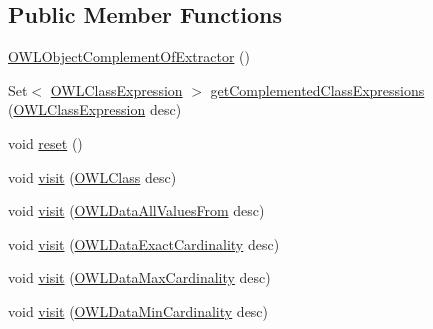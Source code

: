 \subsection*{Public Member Functions}
\begin{DoxyCompactItemize}
\item 
\hyperlink{classorg_1_1semanticweb_1_1owlapi_1_1normalform_1_1_o_w_l_object_complement_of_extractor_ad3b2af82adb14c53749efbf0d4d78eea}{O\-W\-L\-Object\-Complement\-Of\-Extractor} ()
\item 
Set$<$ \hyperlink{interfaceorg_1_1semanticweb_1_1owlapi_1_1model_1_1_o_w_l_class_expression}{O\-W\-L\-Class\-Expression} $>$ \hyperlink{classorg_1_1semanticweb_1_1owlapi_1_1normalform_1_1_o_w_l_object_complement_of_extractor_a95a6959c38d18a62e2d6a3ead9c0b31d}{get\-Complemented\-Class\-Expressions} (\hyperlink{interfaceorg_1_1semanticweb_1_1owlapi_1_1model_1_1_o_w_l_class_expression}{O\-W\-L\-Class\-Expression} desc)
\item 
void \hyperlink{classorg_1_1semanticweb_1_1owlapi_1_1normalform_1_1_o_w_l_object_complement_of_extractor_aabba61425b4eb8cdaef51fb9c92c42fb}{reset} ()
\item 
void \hyperlink{classorg_1_1semanticweb_1_1owlapi_1_1normalform_1_1_o_w_l_object_complement_of_extractor_a6d03acc1e968e08c922ce819e4b933fe}{visit} (\hyperlink{interfaceorg_1_1semanticweb_1_1owlapi_1_1model_1_1_o_w_l_class}{O\-W\-L\-Class} desc)
\item 
void \hyperlink{classorg_1_1semanticweb_1_1owlapi_1_1normalform_1_1_o_w_l_object_complement_of_extractor_a541778d64118f17025cb921dd5a157b9}{visit} (\hyperlink{interfaceorg_1_1semanticweb_1_1owlapi_1_1model_1_1_o_w_l_data_all_values_from}{O\-W\-L\-Data\-All\-Values\-From} desc)
\item 
void \hyperlink{classorg_1_1semanticweb_1_1owlapi_1_1normalform_1_1_o_w_l_object_complement_of_extractor_afb5e07de841d7175d8e81a264b8d30ee}{visit} (\hyperlink{interfaceorg_1_1semanticweb_1_1owlapi_1_1model_1_1_o_w_l_data_exact_cardinality}{O\-W\-L\-Data\-Exact\-Cardinality} desc)
\item 
void \hyperlink{classorg_1_1semanticweb_1_1owlapi_1_1normalform_1_1_o_w_l_object_complement_of_extractor_a479a253e38b587a22a95039ba7d7d8f1}{visit} (\hyperlink{interfaceorg_1_1semanticweb_1_1owlapi_1_1model_1_1_o_w_l_data_max_cardinality}{O\-W\-L\-Data\-Max\-Cardinality} desc)
\item 
void \hyperlink{classorg_1_1semanticweb_1_1owlapi_1_1normalform_1_1_o_w_l_object_complement_of_extractor_a875a9fb93e8c0b5a51131d0ed4fdfa92}{visit} (\hyperlink{interfaceorg_1_1semanticweb_1_1owlapi_1_1model_1_1_o_w_l_data_min_cardinality}{O\-W\-L\-Data\-Min\-Cardinality} desc)

\end{DoxyCompactItemize}
